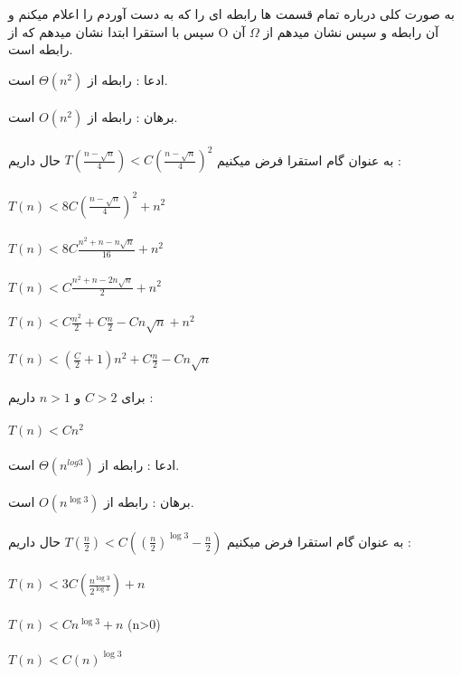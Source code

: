 \problem{}
به صورت کلی درباره تمام قسمت ها رابطه ای را که به دست آوردم را اعلام میکنم و سپس با استقرا 
ابتدا نشان میدهم که از O آن رابطه و 
سپس نشان میدهم از $\Omega$ آن رابطه است.

\subproblem{}





\subproblem{}
ادعا : رابطه از $\Theta(n^2)$ است.\\\\
برهان : رابطه از $O(n^2)$ است. \\\\
به عنوان گام استقرا فرض میکنیم $T(\frac{n - \sqrt{n}}{4}) < C (\frac{n - \sqrt{n}}{4})^2$ حال داریم : \\\\
$T(n) < 8C (\frac{n - \sqrt{n}}{4})^2 + n^2$\\\\
$T(n) < 8C \frac{n^2 +n - n\sqrt{n}}{16} + n^2$\\\\
$T(n) < C \frac{n^2 +n - 2n\sqrt{n}}{2} + n^2$\\\\
$T(n) < C\frac{n^2}{2} + C\frac{n}{2} - Cn\sqrt{n} + n^2$\\\\
$T(n) < (\frac{C}{2}+1)n^2 + C\frac{n}{2} - Cn\sqrt{n}$\\\\
برای $C>2$ و $n>1$ داریم : \\\\
$T(n) < Cn^2$\\\\




\subproblem{}
ادعا : رابطه از $\Theta(n^{log3})$ است.\\\\
برهان : رابطه از $O(n^{\log3})$ است. \\\\
به عنوان گام استقرا فرض میکنیم $T(\frac{n}{2}) < C ((\frac{n}{2})^{\log3} - \frac{n}{2})$ حال داریم : \\\\
$T(n) < 3C (\frac{n^{\log3}}{2^{\log3}}) + n$\\\\
$T(n) < Cn^{\log3} + n$  (n>0)\\\\
$T(n) < C(n)^{\log3}$\\\\\\

